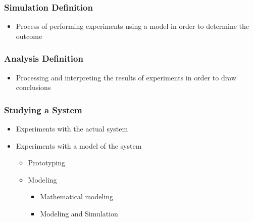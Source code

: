 \subsubsection{Simulation Definition}
\begin{itemize}
	\item Process of performing experiments using a model in order
		to determine the outcome
\end{itemize}

\subsubsection{Analysis Definition}
\begin{itemize}
	\item Processing and interpreting the results of experiments in
		order to draw conclusions
\end{itemize}

\subsubsection{Studying a System}
\begin{itemize}
	\item Experiments with the actual system
	\item Experiments with a model of the system
	\begin{itemize}
		\item Prototyping
		\item Modeling
		\begin{itemize}
			\item Mathematical modeling
			\item Modeling and Simulation
		\end{itemize}
	\end{itemize}
\end{itemize}

